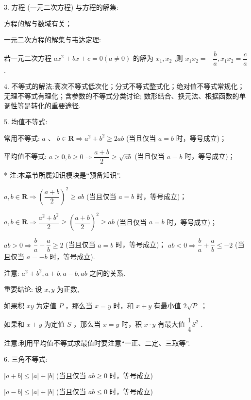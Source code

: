 3. 方程 (一元二次方程) 与方程的解集:

   方程的解与数域有关；

  一元二次方程的解集与韦达定理:

若一元二次方程 $a{x}^{2} + {bx} + c = 0\left( {a \neq  0}\right)$ 的解为 ${x}_{1},{x}_{2}$ ,则 ${x}_{1}{x}_{2} =  - \dfrac{b}{a},{x}_{1}{x}_{2} = \dfrac{c}{a}$ .

4. 不等式的解法:高次不等式低次化；分式不等式整式化；绝对值不等式常规化；无理不等式有理化；含参数的不等式分类讨论; 数形结合、换元法、根据函数的单调性等是转化的重要途径.

5. 均值不等式:

  常用不等式: $a$ 、 $b \in  \mathbf{R} \Rightarrow  {a}^{2} + {b}^{2} \geq  {2ab}$ (当且仅当 $a = b$ 时，等号成立)；

  平均值不等式: $a \geq  0,b \geq  0 \Rightarrow  \dfrac{a + b}{2} \geq  \sqrt{ab}$ (当且仅当 $a = b$ 时，等号成立)；



* 注:本章节所属知识模块是“预备知识”.



   $a,b \in  \mathbf{R} \Rightarrow  {\left( \dfrac{a + b}{2}\right) }^{2} \geq  {ab}$ (当且仅当 $a = b$ 时，等号成立)；

   $a,b \in  \mathbf{R} \Rightarrow  \dfrac{{a}^{2} + {b}^{2}}{2} \geq  {\left( \dfrac{a + b}{2}\right) }^{2} \geq  {ab}$ (当且仅当 $a = b$ 时，等号成立)；

   ${ab} > 0 \Rightarrow  \dfrac{b}{a} + \dfrac{a}{b} \geq  2$ (当且仅当 $a = b$ 时，等号成立)； ${ab} < 0 \Rightarrow  \dfrac{b}{a} + \dfrac{a}{b} \leq   - 2$ (当且仅当 $a =  - b$ 时，等号成立).

注意: ${a}^{2} + {b}^{2},a + b,a - b,{ab}$ 之间的关系.

重要结论: 设 $x,y$ 为正数,

  如果积 ${xy}$ 为定值 $P$ ，那么当 $x = y$ 时，和 $x + y$ 有最小值 $2\sqrt{P}$ ；

  如果和 $x + y$ 为定值 $S$ ，那么当 $x = y$ 时，积 $x \cdot  y$ 有最大值 $\dfrac{1}{4}{S}^{2}$ .

注意:利用平均值不等式求最值时要注意“一正、二定、三取等”.

6. 三角不等式:

   $\left| {a + b}\right|  \leq  \left| a\right|  + \left| b\right|$ (当且仅当 ${ab} \geq  0$ 时，等号成立)

   $\left| {a - b}\right|  \leq  \left| a\right|  + \left| b\right|$ (当且仅当 ${ab} \leq  0$ 时，等号成立)

